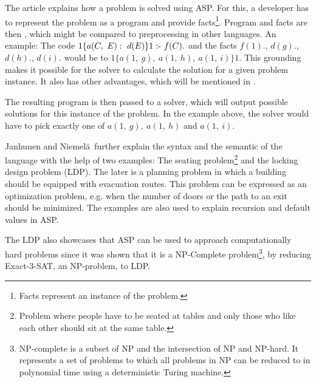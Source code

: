 \documentclass[runningheads]{llncs}
\newcommand{\authorquote}{Janhunen and Niemelä~}
\begin{document}
The article explains how a problem is solved using ASP.  For this, a developer  has to represent the problem as a program and provide facts\footnote{Facts represent an instance of the problem.}.  Program and facts are then , which might be compared to preprocessing in other languages. An example: The code $1\{a(C, ~ E): ~ d(E)\}1 ~ \textrm{:-} ~ f(C).$ and the facts $f(1).$, $d(g).$, $d(h).$, $d(i).$ would be  to $1\{a(1, ~ g), ~ a(1, ~ h), ~ a(1, ~ i)\}1$. This grounding makes it possible for the solver to calculate the solution for a given problem instance. It also has other advantages, which will be mentioned in .


 The resulting program is then passed to a solver, which will output possible solutions for this instance of the problem. In the example above, the solver would have to pick exactly one of $a(1, ~ g), ~ a(1, ~ h)$ and $a(1, ~ i)$. 


\authorquote further explain the syntax and the semantic of the language with the help of two examples: The seating problem\footnote{Problem where people have to be seated at tables and only those who like each other should sit at the same table.} and the locking design problem (LDP). The later is a planning problem  in which a building should be equipped with evacuation routes. This problem can be expressed as an optimization problem, e.g. when the number of doors or the path to an exit should be minimized. The examples are also used to explain recursion and default values in ASP. 

The LDP also showcases that ASP can be used to approach computationally hard problems since it was shown that it is a NP-Complete problem\footnote{NP-complete is a subset of NP and the intersection of NP and NP-hard. It represents a set of problems to which all problems in NP can be reduced to in polynomial time using a deterministic Turing machine.}, by reducing Exact-3-SAT, an NP-problem, to LDP. 
\end{document}
